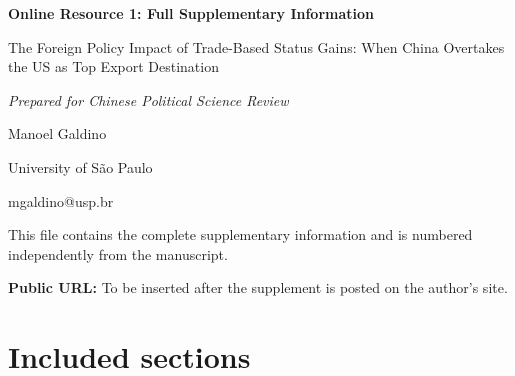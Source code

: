 \documentclass[11pt]{article}
\begin{document}
\thispagestyle{empty}

\begin{center}

{\Large\bfseries Online Resource 1: Full Supplementary Information\par}

\vspace{0.5cm}

{\large The Foreign Policy Impact of Trade-Based Status Gains: When China Overtakes the US as Top Export Destination\par}

\vspace{0.3cm}

\emph{Prepared for Chinese Political Science Review}

\vspace{0.6cm}

Manoel Galdino\par

University of S\~{a}o Paulo\par

mgaldino@usp.br\par

\end{center}

\vspace{0.8cm}

This file contains the complete supplementary information and is numbered independently from the manuscript.

\textbf{Public URL:} To be inserted after the supplement is posted on the author's site.

\section*{Included sections}
\end{document}
